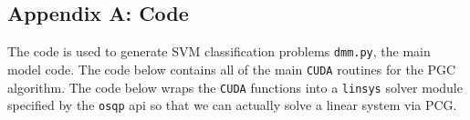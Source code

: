 \documentclass[justified,nobib]{tufte-handout}
\begin{document}
\begin{fullwidth}
\section{Appendix A: Code}
The code is used to generate SVM classification problems \texttt{dmm.py}, the main model code. 
%
\clearpage
The code below contains all of the main \texttt{CUDA} routines for the PGC algorithm.
%
\clearpage
The code below wraps the \texttt{CUDA} functions into a \texttt{linsys} solver module specified by the \texttt{osqp} api so that we can actually solve a linear system via PCG.
%

\end{fullwidth}
\end{document}
